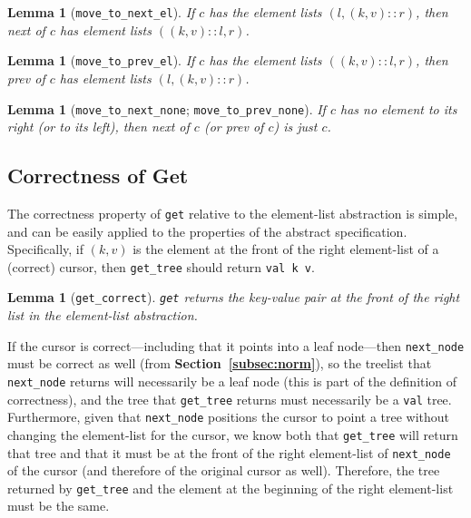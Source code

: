 \documentclass[12pt]{article}
\newtheorem{lemma}[theorem]{Lemma}
\begin{document}
\begin{lemma}[\texttt{move\_to\_next\_el}]
\label{lemma:move_to_next_el}
If $c$ has the element lists $(l,(k,v)::r)$, then next of $c$ has element lists $((k,v)::l,r)$.
\end{lemma}

\begin{lemma}[\texttt{move\_to\_prev\_el}]
\label{lemma:move_to_prev_el}
If $c$ has the element lists $((k,v)::l,r)$, then prev of $c$ has element lists $(l,(k,v)::r)$.
\end{lemma}

\begin{lemma}[\texttt{move\_to\_next\_none}; \texttt{move\_to\_prev\_none}]
\label{lemma:move_to_none}
If $c$ has no element to its right (or to its left), then next of $c$ (or prev of $c$) is just $c$.
\end{lemma}

\subsection{Correctness of Get}
\label{subsec:getcorrect}

The correctness property of \texttt{get} relative to the element-list abstraction is simple, and can be easily applied to the properties of the abstract specification. Specifically, if $(k,v)$ is the element at the front of the right element-list of a (correct) cursor, then \texttt{get\_tree} should return \texttt{val k v}.

\begin{lemma}[\texttt{get\_correct}]
\texttt{get} returns the key-value pair at the front of the right list in the element-list abstraction.
\end{lemma}

If the cursor is correct---including that it points into a leaf node---then \texttt{next\_node} must be correct as well (from \textbf{Section~\ref{subsec:norm}}), so the treelist that \texttt{next\_node} returns will necessarily be a leaf node (this is part of the definition of correctness), and the tree that \texttt{get\_tree} returns must necessarily be a \texttt{val} tree. Furthermore, given that \texttt{next\_node} positions the cursor to point a tree without changing the element-list for the cursor, we know both that \texttt{get\_tree} will return that tree and that it must be at the front of the right element-list of \texttt{next\_node} of the cursor (and therefore of the original cursor as well). Therefore, the tree returned by \texttt{get\_tree} and the element at the beginning of the right element-list must be the same.
\end{document}
